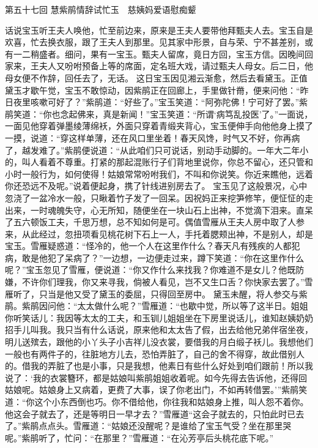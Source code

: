 \documentclass[12pt,oneside]{book}
\begin{document}
 
第五十七回  慧紫鹃情辞试忙玉　慈姨妈爱语慰痴颦


话说宝玉听王夫人唤他，忙至前边来，原来是王夫人要带他拜甄夫人去。宝玉自是欢喜，忙去换衣服，跟了王夫人到那里。见其家中形景，自与荣、宁不甚差别，或有一二稍盛者。细问，果有一宝玉。甄夫人留席，竟日方回，宝玉方信。因晚间回家来，王夫人又吩咐预备上等的席面，定名班大戏，请过甄夫人母女。后二日，他母女便不作辞，回任去了，无话。
这日宝玉因见湘云渐愈，然后去看黛玉。正值黛玉才歇午觉，宝玉不敢惊动，因紫鹃正在回廊上，手里做针黹，便来问他：“昨日夜里咳嗽可好了？”紫鹃道：“好些了。”宝玉笑道：“阿弥陀佛！宁可好了罢。”紫鹃笑道：“你也念起佛来，真是新闻！”宝玉笑道：“所谓‘病笃乱投医’了。”一面说，一面见他穿着弹墨绫薄绵袄，外面只穿着青缎夹背心，宝玉便伸手向他他身上摸了一摸，说道：“穿这样单薄，还在风口里坐着！春天风馋，时气又不好，你再病了，越发难了。”紫鹃便说道：“从此咱们只可说话，别动手动脚的。一年大二年小的，叫人看着不尊重。打紧的那起混账行子们背地里说你，你总不留心，还只管和小时一般行为，如何使得！姑娘常常吩咐我们，不叫和你说笑。你近来瞧他，远着你还恐远不及呢。”说着便起身，携了针线进别房去了。
宝玉见了这般景况，心中忽浇了一盆冷水一般，只瞅着竹子发了一回呆。因祝妈正来挖笋修竿，便怔怔的走出来，一时魂魄失守，心无所知，随便坐在一块山石上出神，不觉滴下泪来。直呆了五六顿饭工夫，千思万想，总不知如何是可。偶值雪雁从王夫人房中取了人参来，从此经过，忽扭项看见桃花树下石上一人，手托着腮颊出神，不是别人，却是宝玉。雪雁疑惑道：“怪冷的，他一个人在这里作什么？春天凡有残疾的人都犯病，敢是他犯了呆病了？”一边想，一边便走过来，蹲下笑道：“你在这里作什么呢？”宝玉忽见了雪雁，便说道：“你又作什么来找我？你难道不是女儿？他既防嫌，不许你们理我，你又来寻我，倘被人看见，岂不又生口舌？你快家去罢了。”雪雁听了，只当是他又受了黛玉的委屈，只得回至房中。
黛玉未醒，将人参交与紫鹃。紫鹃因问他：“太太做什么呢？”雪雁道：“也歇中觉，所以等了这半日。姐姐你听笑话儿：我因等太太的工夫，和玉钏儿姐姐坐在下房里说话儿，谁知赵姨奶奶招手儿叫我。我只当有什么话说，原来他和太太告了假，出去给他兄弟伴宿坐夜，明儿送殡去，跟他的小丫头子小吉祥儿没衣裳，要借我的月白缎子袄儿。我想他们一般也有两件子的，往脏地方儿去，恐怕弄脏了，自己的舍不得穿，故此借别人的。借我的弄脏了也是小事，只是我想，他素日有些什么好处到咱们跟前！所以我说了：‘我的衣裳簪环，都是姑娘叫紫鹃姐姐收着呢。如今先得去告诉他，还得回姑娘呢。姑娘身上又病着，更费了大事，误了你老出门，不如再转借罢。’”紫鹃笑道：“你这个小东西倒也巧。你不借给他，你往我和姑娘身上推，叫人怨不着你。他这会子就去了，还是等明日一早才去？”雪雁道“这会子就去的，只怕此时已去了。”紫鹃点点头。雪雁道：“姑娘还没醒呢？是谁给了宝玉气受？坐在那里哭呢。”紫鹃听了，忙问：“在那里？”雪雁道：“在沁芳亭后头桃花底下呢。”
\end{document}
